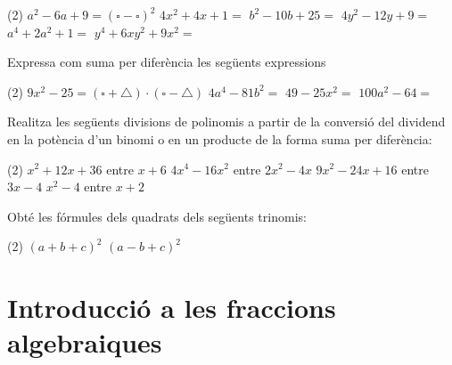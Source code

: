 \begin{mylist}
\begin{tasks}(2)
	\task  ${a}^{2} - 6{a +} 9 = \left(\square - \square \right)^2$   
	\task  $4{x}^{2} + 4x + 1 =$   
	\task  ${b}^{2} - 10{b} + 25=$
	\task  $4{y}^{2} - 12{y} + 9 =$   
	\task  ${a}^{4} + 2{a}^{2} +1=$    
	\task  ${y}^{4} + 6x{y}^{2} + 9{x}^{2}=$
\end{tasks}

\answers{[$(a-3)^2$, $(2x+1)^2$, $(b-5)^2$, $(2y-3)^2$, $(a^2+1)^2$, $(y^2+3x)^2$]}

\vspace{0.5cm}

\exer \spen  Expressa com suma per diferència les següents expressions

\begin{tasks}(2)
	\task  $9x^2-25 = \left(\square + \triangle \right) \cdot \left(\square - \triangle \right)  $    
	\task  $4 a^4 - 81 b^2 =$   
	\task  $49-25x^2 =$ 
	\task  $100 a^2 -64=$
\end{tasks}

 \answers{[$(3x+5)(3x-5)$, $(2a^2+9b)(2a^2-9b)$, $(7+5x)(7-5x)$, $(10a+8)(10a-8)$]} 
\vspace{0.5cm}

\exer  Realitza les següents divisions de polinomis a partir de la conversió del dividend en la potència d'un binomi o en un producte de la forma suma per diferència:

\begin{tasks}(2)
	\task $x^{2} +12x+36$    entre $x+6$      
	\task  $4x^{4} -16x^{2} $ entre $2x^{2} -4x$ 
	\task  $9x^{2} -24x+16$ entre $3x-4$     
	\task  $x^{2} -4$  entre $x+2$   
\end{tasks}

\answers[cols=1]{[$(x+6)^2 / (x+6)=x+6$, $(2x^2+4x)(2x^2-4x)/(2x^2-4x)=2x^2+4x$, $(3x-4)^2/(3x-4)=3x-4$, $(x+2)(x-2)/(x+2)=x-2$]}
\vspace{0.5cm}


\exer \hot  Obté les fórmules dels quadrats dels següents trinomis:

\begin{tasks}(2)
	\task $(a+b+c)^{2} $    
	\task  $(a-b+c)^{2} $ 
\end{tasks}

\answers{[$a^2+b^2+c^2+2ab+2ac+2bc$, $a^2+b^2+c^2-2ab+2ac-2bc$]}


\end{mylist}


\section{Introducció a les fraccions algebraiques}


